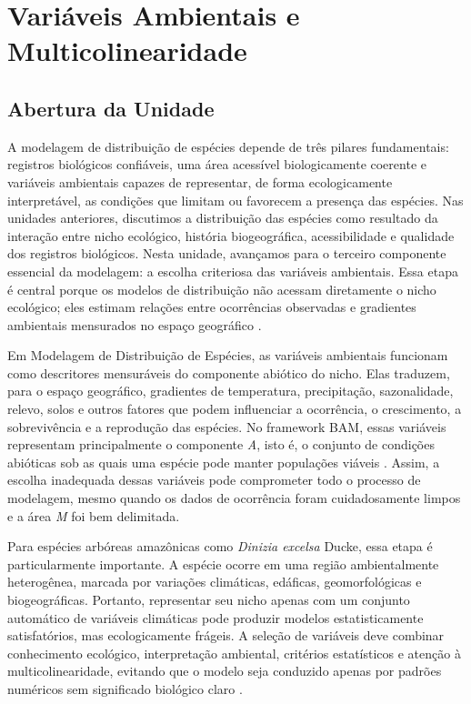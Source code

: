 
\chapter{Variáveis Ambientais e Multicolinearidade}

\section*{Abertura da Unidade}

A modelagem de distribuição de espécies depende de três pilares fundamentais: registros biológicos confiáveis, uma área acessível biologicamente coerente e variáveis ambientais capazes de representar, de forma ecologicamente interpretável, as condições que limitam ou favorecem a presença das espécies. Nas unidades anteriores, discutimos a distribuição das espécies como resultado da interação entre nicho ecológico, história biogeográfica, acessibilidade e qualidade dos registros biológicos. Nesta unidade, avançamos para o terceiro componente essencial da modelagem: a escolha criteriosa das variáveis ambientais. Essa etapa é central porque os modelos de distribuição não acessam diretamente o nicho ecológico; eles estimam relações entre ocorrências observadas e gradientes ambientais mensurados no espaço geográfico \parencite{hutchinson1957concluding,elith2009species}.

Em Modelagem de Distribuição de Espécies, as variáveis ambientais funcionam como descritores mensuráveis do componente abiótico do nicho. Elas traduzem, para o espaço geográfico, gradientes de temperatura, precipitação, sazonalidade, relevo, solos e outros fatores que podem influenciar a ocorrência, o crescimento, a sobrevivência e a reprodução das espécies. No framework BAM, essas variáveis representam principalmente o componente \textit{A}, isto é, o conjunto de condições abióticas sob as quais uma espécie pode manter populações viáveis \parencite{soberon2007grinnellian,peterson2011ecological}. Assim, a escolha inadequada dessas variáveis pode comprometer todo o processo de modelagem, mesmo quando os dados de ocorrência foram cuidadosamente limpos e a área \textit{M} foi bem delimitada.

Para espécies arbóreas amazônicas como \textit{Dinizia excelsa} Ducke, essa etapa é particularmente importante. A espécie ocorre em uma região ambientalmente heterogênea, marcada por variações climáticas, edáficas, geomorfológicas e biogeográficas. Portanto, representar seu nicho apenas com um conjunto automático de variáveis climáticas pode produzir modelos estatisticamente satisfatórios, mas ecologicamente frágeis. A seleção de variáveis deve combinar conhecimento ecológico, interpretação ambiental, critérios estatísticos e atenção à multicolinearidade, evitando que o modelo seja conduzido apenas por padrões numéricos sem significado biológico claro \parencite{franklin2010mapping,guisan2017habitat}.


